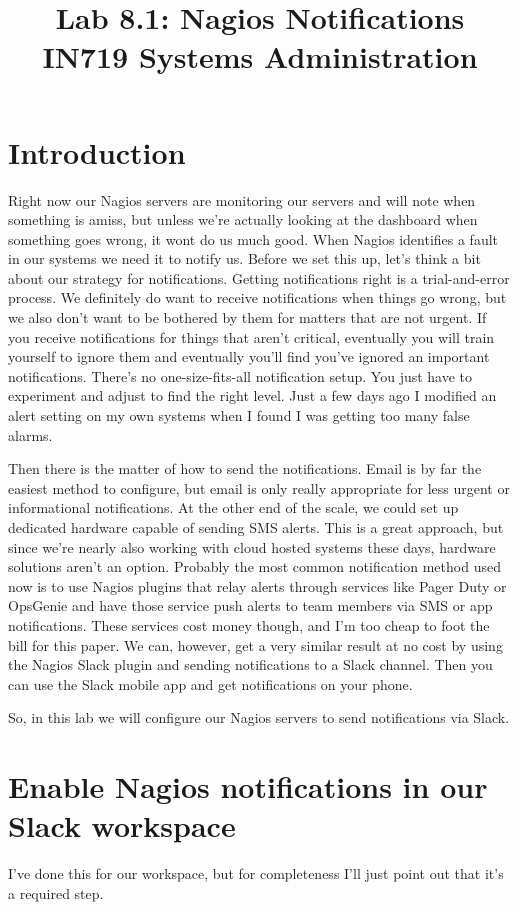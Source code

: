 \documentclass{article}   	%
\title{Lab 8.1:  Nagios Notifications\\ IN719 Systems Administration}
\date{}							%
\begin{document}
\maketitle

\section*{Introduction}
Right now our Nagios servers are monitoring our servers and will note when something is amiss, but unless we're actually looking at the dashboard when something goes wrong, it wont do us much good. When Nagios identifies a fault in our systems we need it to notify us. Before we set this up, let's think a bit about our strategy for notifications. Getting notifications right is a trial-and-error process. We definitely do want to receive notifications when things go wrong, but we also don't want to be bothered by them for matters that are not urgent. If you receive notifications for things that aren't critical, eventually you will train yourself to ignore them and eventually you'll find you've ignored an important notifications. There's no one-size-fits-all notification setup. You just have to experiment and adjust to find the right level. Just a few days ago I modified an alert setting on my own systems when I found I was getting too many false alarms.

Then there is the matter of how to send the notifications. Email is by far the easiest method to configure, but email is only really appropriate for less urgent or informational notifications. At the other end of the scale, we could set up dedicated hardware capable of sending SMS alerts. This is a great approach, but since we're nearly also working with cloud hosted systems these days, hardware solutions aren't an option. Probably the most common notification method used now is to use Nagios plugins that relay alerts through services like Pager Duty or OpsGenie and have those service push alerts to team members via SMS or app notifications. These services cost money though, and I'm too cheap to foot the bill for this paper. We can, however, get a very similar result at no cost by using the Nagios Slack plugin and sending notifications to a Slack channel. Then you can use the Slack mobile app and get notifications on your phone.

So, in this lab we will configure our Nagios servers to send notifications via Slack.

\section{Enable Nagios notifications in our Slack workspace}
I've done this for our workspace, but for completeness I'll just point out that it's a required step.
\end{document}
